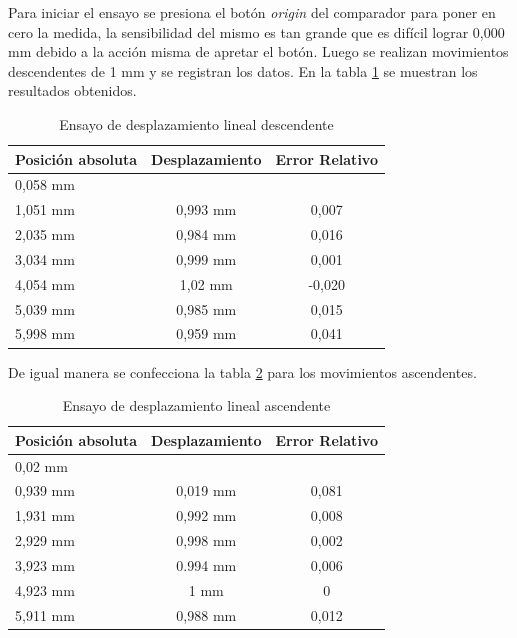Para iniciar el ensayo se presiona el botón \textit{origin} del comparador para poner en cero la medida, la sensibilidad del mismo es tan grande que es difícil lograr 0,000 mm debido a la acción misma  de apretar el botón. Luego se realizan movimientos descendentes de 1 mm y se registran los datos.
En la tabla \ref{tab:ensayo_desplazamiento_des} se muestran los resultados obtenidos.

\begin{table}[h!]
	\centering
	\caption[Ensayo de desplazamiento]{Ensayo de desplazamiento lineal descendente}
	\begin{tabular}{l c c }    
		\toprule
		\textbf{Posición absoluta}     & \textbf{Desplazamiento} & \textbf{Error Relativo} \\
		\midrule
		0,058 mm	& 	        	& 	 			 	\\		
		1,051 mm    & 	0,993 mm    	& 	0,007				\\
		2,035 mm 	& 	0,984 mm	    & 	0,016 				\\
		3,034 mm	& 	0,999 mm	    & 	0,001 			\\
		4,054 mm 	& 	1,02 mm         & 	-0,020					\\
		5,039 mm 	& 	0,985 mm	    & 	0,015					\\
		5,998 mm 	& 	0,959 mm        & 	0,041 			\\
		\bottomrule
		\hline
	\end{tabular}
	\label{tab:ensayo_desplazamiento_des}
\end{table}

De igual manera se confecciona la tabla \ref{tab:ensayo_desplazamiento_asc} para los movimientos ascendentes.
 
\begin{table}[h!]
	\centering
	\caption[Ensayo de desplazamiento]{Ensayo de desplazamiento lineal ascendente}
	\begin{tabular}{l c c }    
		\toprule
		\textbf{Posición absoluta}     & \textbf{Desplazamiento} & \textbf{Error Relativo} \\
		\midrule
		0,02 mm	& 	        	& 	 			 	\\		
		0,939 mm    & 	0,019 mm    	& 	0,081	\\
		1,931 mm 	& 	0,992 mm	    & 	0,008 	\\
		2,929 mm	& 	0,998 mm	    & 	0,002 	\\
		3,923 mm 	& 	0.994 mm        & 	0,006	\\
		4,923 mm 	& 	1 mm	    	& 	0		\\
		5,911 mm 	& 	0,988 mm        & 	0,012 	\\
		\bottomrule
		\hline
	\end{tabular}
	\label{tab:ensayo_desplazamiento_asc}
\end{table}


